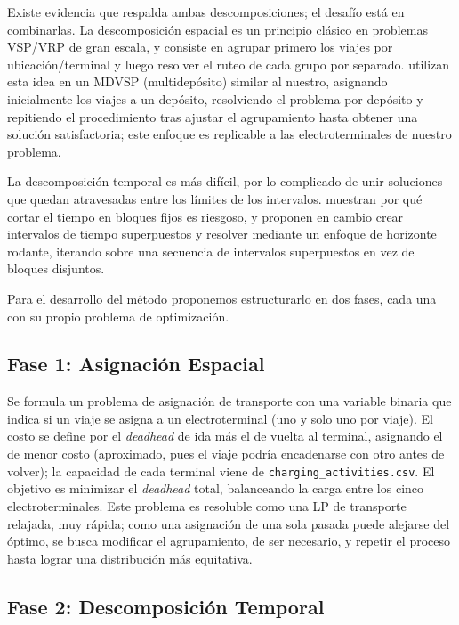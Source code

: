 Existe evidencia que respalda ambas descomposiciones; el desaf\'io est\'a en combinarlas. La descomposici\'on espacial es un principio cl\'asico en problemas VSP/VRP de gran escala, y consiste en agrupar primero los viajes por ubicaci\'on/terminal y luego resolver el ruteo de cada grupo por separado.  utilizan esta idea en un MDVSP (multidep\'osito) similar al nuestro, asignando inicialmente los viajes a un dep\'osito, resolviendo el problema por dep\'osito y repitiendo el procedimiento tras ajustar el agrupamiento hasta obtener una soluci\'on satisfactoria; este enfoque es replicable a las electroterminales de nuestro problema.

La descomposici\'on temporal es m\'as dif\'icil, por lo complicado de unir soluciones que quedan atravesadas entre los l\'imites de los intervalos.  muestran por qu\'e cortar el tiempo en bloques fijos es riesgoso, y proponen en cambio crear intervalos de tiempo superpuestos y resolver mediante un enfoque de horizonte rodante, iterando sobre una secuencia de intervalos superpuestos en vez de bloques disjuntos.

Para el desarrollo del m\'etodo proponemos estructurarlo en dos fases, cada una con su propio problema de optimizaci\'on.

\subsection{Fase 1: Asignaci\'on Espacial \label{sec:fase1}}

Se formula un problema de asignaci\'on de transporte con una variable binaria que indica si un viaje se asigna a un electroterminal (uno y solo uno por viaje). El costo se define por el \emph{deadhead} de ida m\'as el de vuelta al terminal, asignando el de menor costo (aproximado, pues el viaje podr\'ia encadenarse con otro antes de volver); la capacidad de cada terminal viene de \texttt{charging\_activities.csv}. El objetivo es minimizar el \emph{deadhead} total, balanceando la carga entre los cinco electroterminales. Este problema es resoluble como una LP de transporte relajada, muy r\'apida; como una asignaci\'on de una sola pasada puede alejarse del \'optimo, se busca modificar el agrupamiento, de ser necesario, y repetir el proceso hasta lograr una distribuci\'on m\'as equitativa.

\subsection{Fase 2: Descomposici\'on Temporal \label{sec:fase2}}

